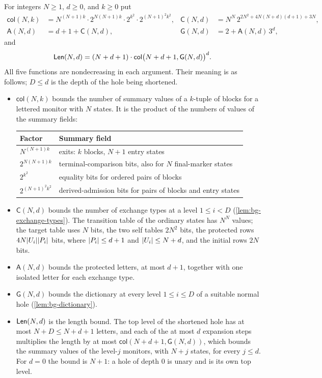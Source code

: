 For integers $N\ge1$, $d\ge0$, and $k\ge0$ put
\begin{equation}\label{eq:bg-col}
\begin{aligned}
 \mathsf{col}(N,k)&=N^{(N+1)k}\cdot2^{N(N+1)k}\cdot2^{k^2}\cdot2^{(N+1)^2k^2},
 &\mathsf C(N,d)&=N^N\,2^{2N^2+4N(N+d)(d+1)+3N},\\
 \mathsf A(N,d)&=d+1+\mathsf C(N,d),
 &\mathsf G(N,d)&=2+\mathsf A(N,d)\,3^d,
\end{aligned}
\end{equation}
and
\begin{equation}\label{eq:bg-len}
 \mathsf{Len}(N,d)=(N+d+1)\cdot\mathsf{col}\bigl(N+d+1,\mathsf G(N,d)\bigr)^d .
\end{equation}
All five functions are nondecreasing in each argument. Their meaning is as
follows; $D\le d$ is the depth of the hole being shortened.
\begin{itemize}[leftmargin=*]
\item $\mathsf{col}(N,k)$ bounds the number of summary values of a $k$-tuple of
  blocks for a lettered monitor with $N$ states. It is the product of the
  numbers of values of the summary fields:
  \begin{center}
  \begin{tabular}{@{}ll@{}}
  \toprule
  Factor & Summary field\\
  \midrule
  $N^{(N+1)k}$ & exits: $k$ blocks, $N+1$ entry states\\
  $2^{N(N+1)k}$ & terminal-comparison bits, also for $N$ final-marker states\\
  $2^{k^2}$ & equality bits for ordered pairs of blocks\\
  $2^{(N+1)^2k^2}$ & derived-admission bits for pairs of blocks and entry states\\
  \bottomrule
  \end{tabular}
  \end{center}
\item $\mathsf C(N,d)$ bounds the number of exchange types at a level $1\le i<D$
  (\cref{lem:bg-exchange-types}). The transition table of the ordinary states
  has $N^N$ values; the target table uses $N$ bits, the two self tables $2N^2$
  bits, the protected rows $4N\lvert U_i\rvert\lvert P_i\rvert$ bits, where $\lvert P_i\rvert\le d+1$
  and $\lvert U_i\rvert\le N+d$, and the initial rows $2N$ bits.
\item $\mathsf A(N,d)$ bounds the protected letters, at most $d+1$, together with
  one isolated letter for each exchange type.
\item $\mathsf G(N,d)$ bounds the dictionary at every level $1\le i\le D$ of a
  suitable normal hole (\cref{lem:bg-dictionary}).
\item $\mathsf{Len}(N,d)$ is the length bound. The top level of the shortened hole
  has at most $N+D\le N+d+1$ letters, and each of the at most $d$ expansion
  steps multiplies the length by at most $\mathsf{col}(N+d+1,\mathsf G(N,d))$,
  which bounds the summary values of the level-$j$ monitors, with $N+j$ states,
  for every $j\le d$. For $d=0$ the bound is $N+1$: a hole of depth $0$ is unary
  and is its own top level.
\end{itemize}

